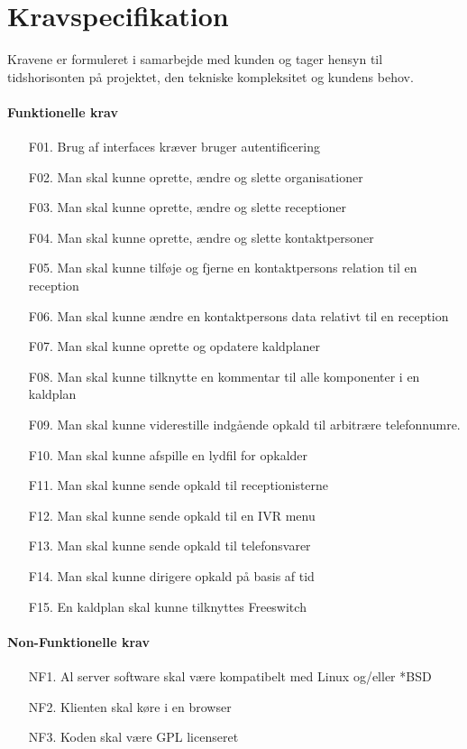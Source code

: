 \section{Kravspecifikation}
Kravene er formuleret i samarbejde med kunden og tager hensyn til tidshorisonten på projektet, den tekniske kompleksitet og kundens behov.

\paragraph{Funktionelle krav}
\begin{enumerate}
  \item[F01.] Brug af interfaces kræver bruger autentificering
  \item[F02.] Man skal kunne oprette, ændre og slette organisationer
  \item[F03.] Man skal kunne oprette, ændre og slette receptioner
  \item[F04.] Man skal kunne oprette, ændre og slette kontaktpersoner
  \item[F05.] Man skal kunne tilføje og fjerne en kontaktpersons relation til en reception
  \item[F06.] Man skal kunne ændre en kontaktpersons data relativt til en reception
  \item[F07.] Man skal kunne oprette og opdatere kaldplaner
  \item[F08.] Man skal kunne tilknytte en kommentar til alle komponenter i en kaldplan
  \item[F09.] Man skal kunne viderestille indgående opkald til arbitrære telefonnumre.
  \item[F10.] Man skal kunne afspille en lydfil for opkalder 
  \item[F11.] Man skal kunne sende opkald til receptionisterne
  \item[F12.] Man skal kunne sende opkald til en IVR menu
  \item[F13.] Man skal kunne sende opkald til telefonsvarer
  \item[F14.] Man skal kunne dirigere opkald på basis af tid
  \item[F15.] En kaldplan skal kunne tilknyttes Freeswitch
\end{enumerate}

\paragraph{Non-Funktionelle krav}
\begin{enumerate}
  \item[NF1.] Al server software skal være kompatibelt med Linux og/eller *BSD
  \item[NF2.] Klienten skal køre i en browser
  \item[NF3.] Koden skal være GPL licenseret
\end{enumerate}

